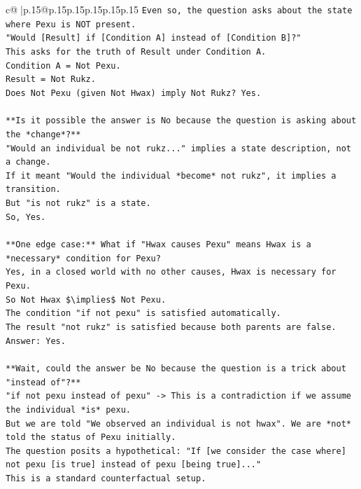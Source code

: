 \documentclass{article}
\begin{document}
{\begin{supertabular}{c@{$\;$}|p{.15\linewidth}@{}p{.15\linewidth}p{.15\linewidth}p{.15\linewidth}p{.15\linewidth}p{.15\linewidth}}
{{{\texttt{Even so, the question asks about the state where Pexu is NOT present.} \\
\texttt{"Would {[}Result{]} if {[}Condition A{]} instead of {[}Condition B{]}?"} \\
\texttt{This asks for the truth of Result under Condition A.} \\
\texttt{Condition A = Not Pexu.} \\
\texttt{Result = Not Rukz.} \\
\texttt{Does Not Pexu (given Not Hwax) imply Not Rukz? Yes.} \\
\\ 
\texttt{**Is it possible the answer is No because the question is asking about the *change*?**} \\
\texttt{"Would an individual be not rukz..." implies a state description, not a change.} \\
\texttt{If it meant "Would the individual *become* not rukz", it implies a transition.} \\
\texttt{But "is not rukz" is a state.} \\
\texttt{So, Yes.} \\
\\ 
\texttt{**One edge case:** What if "Hwax causes Pexu" means Hwax is a *necessary* condition for Pexu?} \\
\texttt{Yes, in a closed world with no other causes, Hwax is necessary for Pexu.} \\
\texttt{So Not Hwax \$\textbackslash{}implies\$ Not Pexu.} \\
\texttt{The condition "if not pexu" is satisfied automatically.} \\
\texttt{The result "not rukz" is satisfied because both parents are false.} \\
\texttt{Answer: Yes.} \\
\\ 
\texttt{**Wait, could the answer be No because the question is a trick about "instead of"?**} \\
\texttt{"if not pexu instead of pexu" {-}> This is a contradiction if we assume the individual *is* pexu.} \\
\texttt{But we are told "We observed an individual is not hwax". We are *not* told the status of Pexu initially.} \\
\texttt{The question posits a hypothetical: "If {[}we consider the case where{]} not pexu {[}is true{]} instead of pexu {[}being true{]}..."} \\
\texttt{This is a standard counterfactual setup.} \\
}}}
\end{supertabular}}
\end{document}
